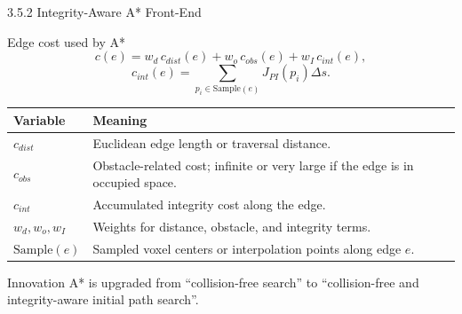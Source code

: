 \documentclass[10pt,aspectratio=169,xcolor=dvipsnames]{beamer}
\begin{document}
\begin{frame}{3.5.2 Integrity-Aware A* Front-End}
  \small
  \begin{block}{Edge cost used by A*}
    \vspace{-4pt}
    \[
      c(e)=w_d\,c_{dist}(e)+w_o\,c_{obs}(e)+w_I\,c_{int}(e),
    \]
    \[
      c_{int}(e)=\sum_{p_i\in\mathrm{Sample}(e)}J_{PI}(p_i)\Delta s.
    \]
  \end{block}

  \begin{table}\scriptsize
    \begin{tabular}{p{} p{}}
      \toprule
      \textbf{Variable} & \textbf{Meaning}\\
      \midrule
      $c_{dist}$ & Euclidean edge length or traversal distance.\\
      $c_{obs}$ & Obstacle-related cost; infinite or very large if the edge is in occupied space.\\
      $c_{int}$ & Accumulated integrity cost along the edge.\\
      $w_d,w_o,w_I$ & Weights for distance, obstacle, and integrity terms.\\
      $\mathrm{Sample}(e)$ & Sampled voxel centers or interpolation points along edge $e$.\\
      \bottomrule
    \end{tabular}
  \end{table}

  \begin{exampleblock}{Innovation}
    \footnotesize A* is upgraded from ``collision-free search'' to ``collision-free and integrity-aware initial path search''.
  \end{exampleblock}
\end{frame}
\end{document}
